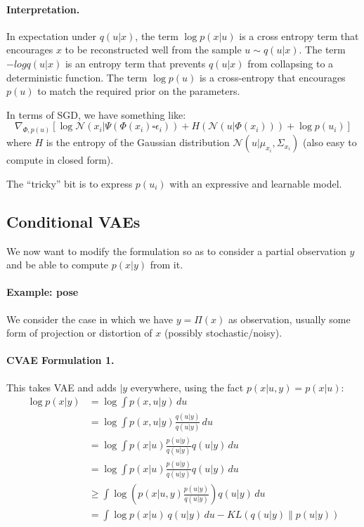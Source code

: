 \paragraph{Interpretation.} In expectation under $q(u|x)$, the term $\log p(x|u)$ is a cross entropy term that encourages $x$ to be reconstructed well from the sample $u \sim q(u|x)$. The term $-log q(u|x)$ is an entropy term that prevents $q(u|x)$ from collapsing to a deterministic function. The term $\log p(u)$  is a cross-entropy that encourages $p(u)$ to match the required prior on the parameters.

In terms of SGD, we have something like:
$$
  \nabla_{\Phi,p(u)}
  \left[
    \log \mathcal{N} (x_i| \Psi(\Phi(x_i) \square \epsilon_i))
    + H(\mathcal{N}(u|\Phi(x_i)))
    + \log p(u_i)
  \right]
$$
where $H$ is the entropy of the Gaussian distribution $\mathcal{N}(u|\mu_{x_i}, \Sigma_{x_i})$ (also easy to compute in closed form).

The ``tricky'' bit is to express $p(u_i)$ with an expressive and learnable model.

\subsection{Conditional VAEs}

We now want to modify the formulation so as to consider a partial observation $y$ and be able to compute $p(x|y)$ from it.

\paragraph{Example: pose} We consider the case in which we have $y = \Pi(x)$ as observation, usually some form of projection or distortion of $x$ (possibly stochastic/noisy).

\paragraph{CVAE Formulation 1.} This takes VAE and adds $|y$ everywhere, using the fact $p(x|u,y) = p(x|u)$:
$$
\begin{aligned}
\log p(x|y)
&= \log \int p(x,u|y) \,du \\
&= \log \int p(x,u|y) \frac{q(u|y)}{q(u|y)} \,du \\
&= \log \int p(x|u) \frac{p(u|y)}{q(u|y)} q(u|y) \,du \\
&= \log \int p(x|u) \frac{p(u|y)}{q(u|y)} q(u|y) \,du \\
&\geq \int \log \left(p(x|u,y) \frac{p(u|y)}{q(u|y)}\right) q(u|y) \,du \\
&=\int \log p(x|u) ~q(u|y) \,du - KL\left(q(u|y) \| p(u|y)\right)
\end{aligned}
$$

